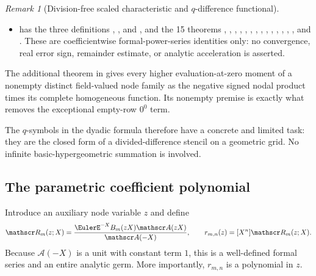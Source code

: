 \documentclass[11pt,oneside]{article}
\theoremstyle{definition}
\theoremstyle{remark}
\newtheorem{remark}[remark]{Remark}
\begin{document}
\begin{remark}[Division-free scaled characteristic and \(q\)-difference functional]
\begin{itemize}
\item {} has the three definitions
,
, and
, and the 15 theorems
,
,
,
,
,
,
,
,
,
,
,
,
,
, and
.  These are
coefficientwise formal-power-series identities only: no convergence, real
error sign, remainder estimate, or analytic acceleration is asserted.
\end{itemize}
The additional theorem
 in
 gives every higher evaluation-at-zero
moment of a nonempty distinct field-valued node family as the negative signed
nodal product times its complete homogeneous function.  Its nonempty premise
is exactly what removes the exceptional empty-row \(0^0\) term.
\end{remark}

The $q$-symbols in the dyadic formula therefore have a concrete and limited task: they are the
closed form of a divided-difference stencil on a geometric grid.  No infinite
basic-hypergeometric summation is involved.

\subsection{The parametric coefficient polynomial}

Introduce an auxiliary node variable $z$ and define
\begin{equation}
 \mathscr R_m(z;X)
 =\frac{\EulerE^{-X}B_m(zX)\mathscr A(zX)}{\mathscr A(-X)},
 \qquad
 r_{m,n}(z)=[X^n]\mathscr R_m(z;X).                        \label{dyadicweb:eq:Rmn-def}
\end{equation}
Because $\mathscr A(-X)$ is a unit with constant term $1$, this is a well-defined formal
series and an entire analytic germ.  More importantly, $r_{m,n}$ is a polynomial in $z$.
\end{document}
